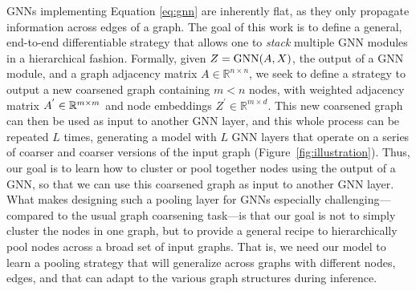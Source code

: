 GNNs implementing Equation \eqref{eq:gnn} are inherently flat, as they only propagate information across edges of a graph.
The goal of this work is to define a general, end-to-end differentiable strategy that allows one to {\em stack} multiple GNN modules in a hierarchical fashion. 
Formally, given $Z = \textrm{GNN}(A, X)$, the output of a GNN module, and a graph adjacency matrix $A \in \mathbb{R}^{n \times n}$, we seek to define a strategy to output a new coarsened graph containing $m<n$ nodes, with weighted adjacency matrix $A^{'} \in \mathbb{R}^{m \times m}$ and node embeddings $Z^{'} \in \mathbb{R}^{m\times d}$.
This new coarsened graph can then be used as input to another GNN layer, and this whole process can be repeated $L$ times, generating a model with $L$ GNN layers that operate on a series of coarser and coarser versions of the input graph (Figure~\ref{fig:illustration}).
Thus, our goal is to learn how to cluster or pool together nodes using the output of a GNN, so that we can use this coarsened graph as input to another GNN layer.
What makes designing such a pooling layer for GNNs especially challenging---compared to the usual graph coarsening task---is that our goal is not to simply cluster the nodes in one graph, but to provide a general recipe to hierarchically pool nodes across a broad set of input graphs. 
That is, we need our model to learn a pooling strategy that will generalize across graphs with different nodes, edges, and that can adapt to the various graph structures during inference. 

